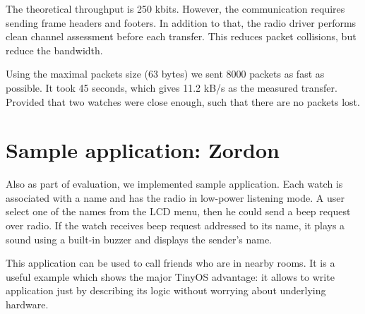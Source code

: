 The theoretical throughput is 250 kbits.
However, the communication requires sending frame headers and footers.
In addition to that, the radio driver performs clean channel assessment before each transfer.
This reduces packet collisions, but reduce the bandwidth.

Using the maximal packets size (63 bytes) we sent 8000 packets as fast as possible.
It took 45 seconds, which gives 11.2 kB/s as the measured transfer.
Provided that two watches were close enough, such that there are no packets lost.


\section{Sample application: Zordon}

Also as part of evaluation, we implemented sample application.
Each watch is associated with a name and has the radio in low-power listening mode.
A user select one of the names from the LCD menu, then he could send a beep request over radio.
If the watch receives beep request addressed to its name, it plays a sound using a built-in buzzer and displays the sender's name.

This application can be used to call friends who are in nearby rooms.
It is a useful example which shows the major TinyOS advantage: it allows to write application just by describing its logic without worrying about underlying hardware.






